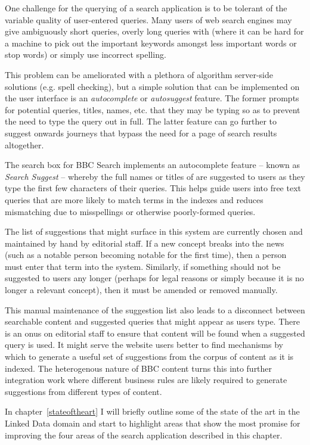 One challenge for the querying of a search application is to be tolerant
of the variable quality of user-entered queries. Many users of web search
engines may give ambiguously short queries, overly long queries with (where
it can be hard for a machine to pick out the important keywords amongst
less important words or stop words\cite{rajaraman2011data})
or simply use incorrect spelling.

This problem can be ameliorated with a plethora of algorithm
server-side solutions (e.g. spell checking), but a simple solution that
can be implemented on the user interface is an \emph{autocomplete}
or \emph{autosuggest} feature. The former prompts for potential
queries, titles, names, etc. that they may be typing so as to prevent
the need to type the query out in full. The latter feature can go
further to suggest onwards journeys that bypass the need for a
page of search results altogether.

The search box for BBC Search implements an autocomplete
feature -- known
as \emph{Search Suggest} -- whereby
the full names or titles of are suggested to users as they type the first
few characters of their queries. This helps guide users into free text
queries that are more likely to match terms in the indexes and reduces
mismatching due to misspellings or otherwise poorly-formed queries.

The list of suggestions that might surface in this system are
currently chosen and maintained by hand by editorial staff. If a new
concept breaks into the news (such as a notable person becoming notable
for the first time), then a person must enter that term into the system.
Similarly, if something should not be suggested to users any longer
(perhaps for legal reasons or simply because it is no longer a relevant
concept), then it must be amended or removed manually.

This manual maintenance of the suggestion list also leads to a
disconnect between searchable content and suggested queries that might
appear as users type. There is an onus on editorial staff to ensure
that content will be found when a suggested query is used. It might
serve the website users better to find mechanisms by which to generate
a useful set of suggestions from the corpus of content as it is
indexed. The heterogenous nature of BBC content turns this into
further integration work where different business rules are likely required
to generate suggestions from different types of content.

In chapter~\ref{stateoftheart} I will briefly outline some of the state of the
art in the Linked Data domain and start to highlight areas that show
the most promise for improving the four areas of the search application
described in this chapter.
